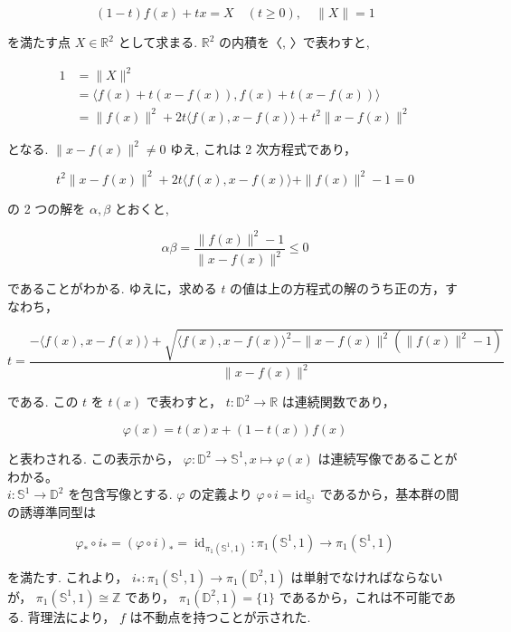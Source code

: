 \documentclass[10pt]{jsarticle}
\begin{document}
$$
(1-t) f(x)+t x=X \quad(t \geq 0), \quad\|X\|=1
$$

を満たす点 $X \in \mathbb{R}^{2}$ として求まる. $\mathbb{R}^{2}$ の内積を〈, 〉で表わすと,

$$
\begin{aligned}
1 & =\|X\|^{2} \\
& =\langle f(x)+t(x-f(x)), f(x)+t(x-f(x))\rangle \\
& =\|f(x)\|^{2}+2 t\langle f(x), x-f(x)\rangle+t^{2}\|x-f(x)\|^{2}
\end{aligned}
$$

となる. $\|x-f(x)\|^{2} \neq 0$ ゆえ, これは 2 次方程式であり，

$$
t^{2}\|x-f(x)\|^{2}+2 t\langle f(x), x-f(x)\rangle+\|f(x)\|^{2}-1=0
$$


の 2 つの解を $\alpha, \beta$ とおくと,

$$
\alpha \beta=\frac{\|f(x)\|^{2}-1}{\|x-f(x)\|^{2}} \leq 0
$$

であることがわかる. ゆえに，求める $t$ の値は上の方程式の解のうち正の方，すなわち，


\begin{equation*}
t=\frac{-\langle f(x), x-f(x)\rangle+\sqrt{\langle f(x), x-f(x)\rangle^{2}-\|x-f(x)\|^{2}\left(\|f(x)\|^{2}-1\right)}}{\|x-f(x)\|^{2}} \tag{2.6a}
\end{equation*}


である. この $t$ を $t(x)$ で表わすと， $t: \mathbb{D}^{2} \longrightarrow \mathbb{R}$ は連続関数であり，

$$
\varphi(x)=t(x) x+(1-t(x)) f(x)
$$

と表わされる. この表示から， $\varphi: \mathbb{D}^{2} \longrightarrow \mathbb{S}^{1}, x \longmapsto \varphi(x)$ は連続写像であることがわかる。\\
$i: \mathbb{S}^{1} \longrightarrow \mathbb{D}^{2}$ を包含写像とする. $\varphi$ の定義より $\varphi \circ i=\mathrm{id}_{\mathbb{S}^{1}}$ であるから，基本群の間の誘導準同型は

$$
\varphi_{*} \circ i_{*}=(\varphi \circ i)_{*}=\operatorname{id}_{\pi_{1}\left(\mathbb{S}^{1}, 1\right)}: \pi_{1}\left(\mathbb{S}^{1}, 1\right) \longrightarrow \pi_{1}\left(\mathbb{S}^{1}, 1\right)
$$

を満たす. これより， $i_{*}: \pi_{1}\left(\mathbb{S}^{1}, 1\right) \longrightarrow \pi_{1}\left(\mathbb{D}^{2}, 1\right)$ は単射でなければならないが， $\pi_{1}\left(\mathbb{S}^{1}, 1\right) \cong \mathbb{Z}$ であり， $\pi_{1}\left(\mathbb{D}^{2}, 1\right)=\{1\}$ であるから，これは不可能である. 背理法により， $f$ は不動点を持つことが示された.
\end{document}
